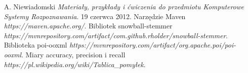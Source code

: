 \documentclass{classrep}
\begin{document}
\begin{thebibliography}{5}
A. Niewiadomski
\textit{Materiały, przykłady i ćwiczenia do przedmiotu Komputerowe Systemy Rozpoznawania}. 
19 czerwca 2012.
Narzędzie Maven\newline
\textit{https://maven.apache.org/}. 
Bibliotek snowball-stemmer\newline
\textit{https://mvnrepository.com/artifact/com.github.rholder/snowball-stemmer}. 
Biblioteka poi-ooxml\newline
\textit{https://mvnrepository.com/artifact/org.apache.poi/poi-ooxml}. 
Miary accuracy, precision i recall\newline
\textit{https://pl.wikipedia.org/wiki/Tablica\_pomyłek}. 
\end{thebibliography}
\end{document}
